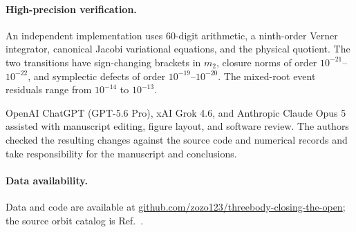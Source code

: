 \documentclass[aps,prl,reprint,amsmath,amssymb]{revtex4-2}
\begin{document}
\paragraph{High-precision verification.}
An independent implementation uses $60$-digit arithmetic, a ninth-order
Verner integrator, canonical Jacobi variational equations, and the physical
quotient. The two transitions have sign-changing brackets in $m_2$, closure
norms of order $10^{-21}$--$10^{-22}$, and symplectic defects of order
$10^{-19}$--$10^{-20}$. The mixed-root event residuals range from $10^{-14}$ to
$10^{-13}$.

\begin{acknowledgments}
OpenAI ChatGPT (GPT-5.6 Pro), xAI Grok 4.6, and Anthropic Claude Opus 5
assisted with manuscript editing, figure layout, and software review. The
authors checked the resulting changes against the source code and numerical
records and take responsibility for the manuscript and conclusions.
\end{acknowledgments}

\paragraph{Data availability.}
Data and code are available at
\href{https://github.com/zozo123/threebody-closing-the-open}
{github.com/zozo123/threebody-closing-the-open}; the source orbit catalog is
Ref.~\cite{li2021stable}.


\end{document}
